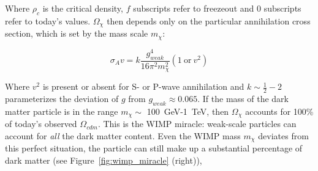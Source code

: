 Where $\rho_{c}$ is the critical density, $f$ subscripts refer to freezeout and $0$ subscripts refer to today's values. $\Omega_{\chi}$ then depends only on the particular annihilation cross section, which is set by the mass scale $m_{\chi}$:

\begin{equation}
\label{eq:sigmav}
\sigma_{A}v = k \frac{g_{weak}^{4}}{16 \pi^{2}m_{\chi}^{2}} ( \mathrm{1~or}~v^{2} ) 
\end{equation}

Where $v^{2}$ is present or absent for S- or P-wave annihilation and $k \sim \frac{1}{2} - 2$ parameterizes the deviation of $g$ from $g_{weak} \approx 0.065$. If the mass of the dark matter particle is in the range $m_{\chi} \sim$ 100~GeV-1~TeV, then $\Omega_{\chi}$ accounts for 100\% of today's observed $\Omega_{cdm}$. This is the \ac{WIMP} miracle: weak-scale particles can account for \textit{all} the dark matter content. Even the \ac{WIMP} mass $m_{\chi}$ deviates from this perfect situation, the particle can still make up a substantial percentage of dark matter (see Figure~\ref{fig:wimp_miracle} (right)),

